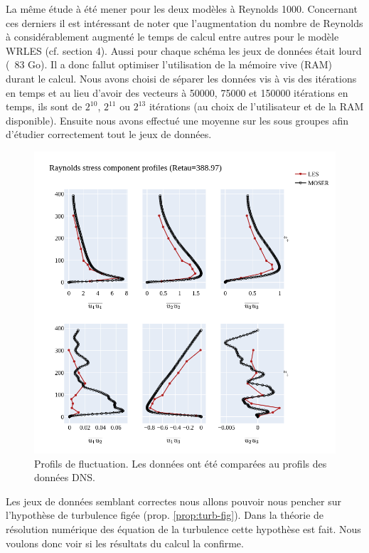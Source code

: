 \documentclass[12pt]{article}   %
\theoremstyle{plain}
\theoremstyle{remark}
\begin{document}
La même étude à été mener pour les deux modèles à Reynolds 1000. Concernant ces derniers il est intéressant de noter que l'augmentation du nombre de Reynolds à considérablement augmenté le temps de calcul entre autres pour le modèle WRLES (cf. section 4). Aussi pour chaque schéma les jeux de données était lourd (~83 Go). Il a donc fallut optimiser l'utilisation de la mémoire vive (RAM) durant le calcul. Nous avons choisi de séparer les données vis à vis des itérations en temps et au lieu d'avoir des vecteurs à 50000, 75000 et 150000 itérations en temps, ils sont de $2^10$, $2^11$ ou $2^13$ itérations (au choix de l'utilisateur et de la RAM disponible). Ensuite nous avons effectué une moyenne sur les sous groupes afin d'étudier correctement tout le jeux de données.\\

\begin{figure}[H]
	\begin{center}
		\includegraphics[width=0.8\linewidth]{../../output/figures/channel_wrles_retau395/split_time/RANS/var_velocity_profiles_all.png}
		\caption{Profils de fluctuation. Les données ont été comparées au profils des données DNS.}
		\label{fig:fluct-vel}
	\end{center}
\end{figure}

Les jeux de données semblant correctes nous allons pouvoir nous pencher sur l'hypothèse de turbulence figée (prop. \ref{prop:turb-fig}). Dans la théorie de résolution numérique des équation de la turbulence cette hypothèse est fait. Nous voulons donc voir si les résultats du calcul la confirme. 
\end{document}

